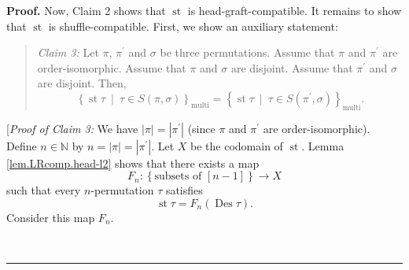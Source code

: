 \documentclass[numbers=enddot,12pt,final,onecolumn,notitlepage]{scrartcl}%
\theoremstyle{definition}
\newenvironment{statement}{\begin{quote}}{\end{quote}}
\newenvironment{proof}[1][Proof]{\noindent\textbf{#1.} }{\ \rule{0.5em}{0.5em}}
\newenvironment{verlong}{}{}
\begin{document}
\begin{verlong}
\begin{proof}
Now, Claim 2 shows that $\operatorname{st}$ is head-graft-compatible. It
remains to show that $\operatorname{st}$ is shuffle-compatible. First, we
show an auxiliary statement:

\begin{statement}
\textit{Claim 3:} Let $\pi$, $\pi^{\prime}$ and $\sigma$ be three
permutations. Assume that $\pi$ and $\pi^{\prime}$ are order-isomorphic.
Assume that $\pi$ and $\sigma$ are disjoint. Assume that $\pi^{\prime}$ and
$\sigma$ are disjoint. Then,%
\[
\left\{  \operatorname{st} \tau   \ \mid\ \tau\in S\left(
\pi,\sigma\right)  \right\}  _{\operatorname*{multi}}=\left\{
\operatorname{st} \tau   \ \mid\ \tau\in S\left(  \pi^{\prime
},\sigma\right)  \right\}  _{\operatorname*{multi}}.
\]

\end{statement}

[\textit{Proof of Claim 3:} We have $\left\vert \pi\right\vert =\left\vert
\pi^{\prime}\right\vert $ (since $\pi$ and $\pi^{\prime}$ are
order-isomorphic). Define $n\in\mathbb{N}$ by $n=\left\vert \pi\right\vert
=\left\vert \pi^{\prime}\right\vert $. Let $X$ be the codomain of
$\operatorname{st}$. Lemma \ref{lem.LRcomp.head-l2} shows that there exists a
map
\[
F_{n}:\left\{  \text{subsets of }\left[  n-1\right]  \right\}  \rightarrow X
\]
such that every $n$-permutation $\tau$ satisfies
\begin{equation}
\operatorname{st} \tau   =F_{n}\left(  \operatorname{Des} \tau\right)
. \label{pf.lem.LRcomp.head-l2.c3.pf.1}
\end{equation}
Consider this map $F_{n}$.


\end{proof}
\end{verlong}
\end{document}
